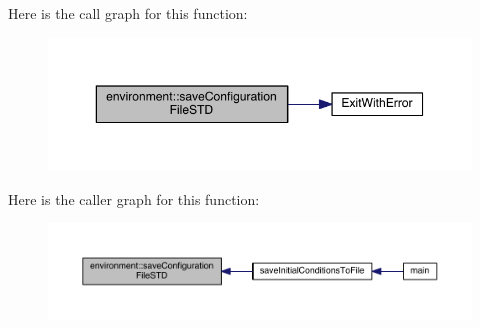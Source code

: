 Here is the call graph for this function\+:\nopagebreak
\begin{figure}[H]
\begin{center}
\leavevmode
\includegraphics[width=350pt]{a00013_a71f4c5ff1c11a9d61cbc818682a4a91e_cgraph}
\end{center}
\end{figure}




Here is the caller graph for this function\+:\nopagebreak
\begin{figure}[H]
\begin{center}
\leavevmode
\includegraphics[width=350pt]{a00013_a71f4c5ff1c11a9d61cbc818682a4a91e_icgraph}
\end{center}
\end{figure}


